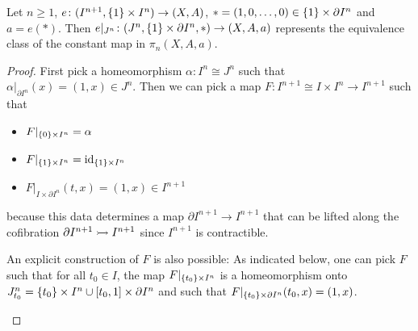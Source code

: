 \begin{lemma}\label{lem:compressionVariation}
    Let $n\geq 1$, $e\colon(I^{n+1},\left\lbrace1\right\rbrace\times I^n)\to (X,A)$, $*=(1,0,\ldots,0)\in\left\lbrace1\right\rbrace\times\partial I^n$ and $a=e(*)$. 
    Then $e|_{J^n}\colon(J^n,\left\lbrace1\right\rbrace\times\partial I^n,*)\to(X,A,a)$ represents the equivalence class of the constant map in $\pi_n(X,A,a)$.
    \begin{proof}
        First pick a homeomorphism $\alpha\colon I^n\cong J^n$ such that $\alpha|_{\partial I^n}(x)=(1,x)\in J^n$.
        Then we can pick a map $F\colon I^{n+1}\cong I\times I^n\to I^{n+1}$ such that 
        \begin{itemize}
            \item $F|_{\left\lbrace0\right\rbrace\times I^n}=\alpha$
            \item $F|_{\left\lbrace1\right\rbrace\times I^n}=\text{id}_{\left\lbrace1\right\rbrace\times I^n}$
            \item $F|_{I\times \partial I^n}(t,x)=(1,x)\in I^{n+1}$
        \end{itemize}
        because this data determines a map $\partial I^{n+1}\to I^{n+1}$ that can be lifted along the cofibration $\partial I^{n+1}\xtailrightarrow{}I^{n+1}$ since $I^{n+1}$ is contractible.

        An explicit construction of $F$ is also possible:
        As indicated below, one can pick $F$ such that for all $t_0\in I$, the map $F|_{\left\lbrace t_0\right\rbrace\times I^n}$ is a homeomorphism onto $J_{t_0}^n=\left\lbrace t_0\right\rbrace\times I^n\cup[t_0,1]\times\partial I^n$ and such that $F|_{\left\lbrace t_0\right\rbrace\times\partial I^n}(t_0,x)=(1,x)$.
        \begin{center}
\end{center}
\end{proof}
\end{lemma}
